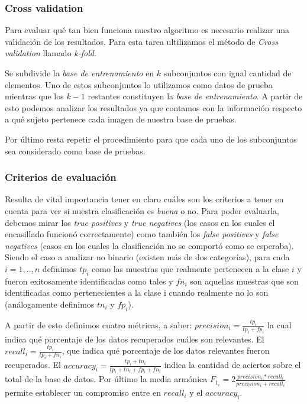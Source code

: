 \subsubsection*{Cross validation} 
\par Para evaluar qu\'e tan bien funciona nuestro algoritmo es necesario realizar una validaci\'on de los resultados. Para esta tarea ultilizamos el m\'etodo de \textit{Cross validation} llamado \textit{k-fold}. \par Se subdivide la \textit{base de entrenamiento} en $k$ subconjuntos con igual cantidad
de elementos. Uno de estos subconjuntos lo utilizamos como datos de prueba mientras que los $k-1$ restantes constituyen la \textit{base de entrenamiento}. A partir de esto
podemos analizar los resultados ya que contamos con la informaci\'on respecto a qu\'e sujeto pertenece cada imagen de nuestra base de pruebas.
\par Por \'ultimo resta repetir
el procedimiento para que cada uno de los subconjuntos sea considerado como base de pruebas.

\subsubsection*{Criterios de evaluaci\'on}
Resulta de vital importancia tener en claro cu\'ales son los criterios a tener en cuenta para ver si nuestra clasificaci\'on es \textit{buena} o no.
Para poder evaluarla, debemos mirar los \textit{true positives} y \textit{true negatives} (los casos en los cuales el encasillado funcion\'o correctamente)
como tambi\'en los \textit{false positives} y \textit{false negatives} (casos en los cuales la clasificaci\'on no se comport\'o como se esperaba).\\
Siendo el caso a analizar no binario (existen m\'as de dos categor\'ias), para cada $i = 1,..,n$  definimos $tp_i$ como
las muestras que realmente pertenecen a la clase $i$ y fueron exitosamente identificadas como tales
y $fn_i$ son aquellas muestras que son identificadas como pertenecientes a la clase i cuando realmente no lo son (an\'alogamente definimos $tn_i$ y $fp_i$).
\par A partir de esto definimos cuatro m\'etricas, a saber:
$precision_i= \frac{tp_i}{tp_i + fp_i}$ la cual indica qu\'e porcentaje de los datos recuperados cu\'ales son relevantes. 
El $recall_i= \frac{tp_i}{tp_i + fn_i}$, que indica qu\'e porcentaje de los datos relevantes fueron recuperados.
El $accuracy_i = \frac{tp_i+tn_i}{tp_i + tn_i + fp_i + fn_i}$ indica la cantidad de aciertos sobre el total de la base de datos.
Por \'ultimo la media arm\'onica $F_{1_i} = 2\frac{precision_i * recall_i}{precision_i + recall_i}$ permite establecer un compromiso entre en 
$recall_i$ y el $accuracy_i$.


